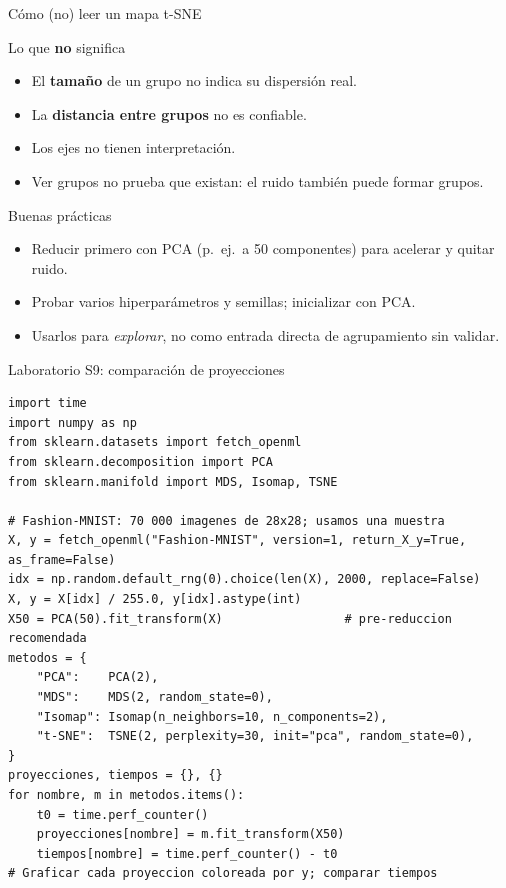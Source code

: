\documentclass[aspectratio=169,11pt]{beamer}
\begin{document}
\begin{frame}{Cómo (no) leer un mapa t-SNE}
  \begin{alertblock}{Lo que \textbf{no} significa}
    \begin{itemize}
      \item El \textbf{tamaño} de un grupo no indica su dispersión real.
      \item La \textbf{distancia entre grupos} no es confiable.
      \item Los ejes no tienen interpretación.
      \item Ver grupos no prueba que existan: el ruido también puede formar grupos.
    \end{itemize}
  \end{alertblock}
  \begin{exampleblock}{Buenas prácticas}
    \begin{itemize}
      \item Reducir primero con PCA (p.\ ej.\ a 50 componentes) para acelerar y quitar ruido.
      \item Probar varios hiperparámetros y semillas; inicializar con PCA.
      \item Usarlos para \emph{explorar}, no como entrada directa de agrupamiento sin validar.
    \end{itemize}
  \end{exampleblock}
\end{frame}

\begin{frame}[fragile]{Laboratorio S9: comparación de proyecciones}
\begin{lstlisting}[basicstyle=\ttfamily\fontsize{6.5}{7.5}\selectfont]
import time
import numpy as np
from sklearn.datasets import fetch_openml
from sklearn.decomposition import PCA
from sklearn.manifold import MDS, Isomap, TSNE

# Fashion-MNIST: 70 000 imagenes de 28x28; usamos una muestra
X, y = fetch_openml("Fashion-MNIST", version=1, return_X_y=True, as_frame=False)
idx = np.random.default_rng(0).choice(len(X), 2000, replace=False)
X, y = X[idx] / 255.0, y[idx].astype(int)
X50 = PCA(50).fit_transform(X)                 # pre-reduccion recomendada
metodos = {
    "PCA":    PCA(2),
    "MDS":    MDS(2, random_state=0),
    "Isomap": Isomap(n_neighbors=10, n_components=2),
    "t-SNE":  TSNE(2, perplexity=30, init="pca", random_state=0),
}
proyecciones, tiempos = {}, {}
for nombre, m in metodos.items():
    t0 = time.perf_counter()
    proyecciones[nombre] = m.fit_transform(X50)
    tiempos[nombre] = time.perf_counter() - t0
# Graficar cada proyeccion coloreada por y; comparar tiempos
\end{lstlisting}
\end{frame}
\end{document}
